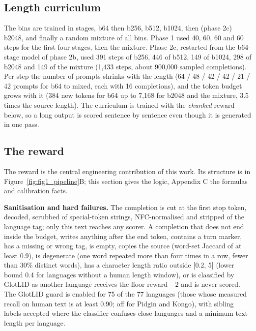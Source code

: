 \subsection{Length curriculum}\label{length-curriculum}

The bins are trained in stages, b64 then b256, b512, b1024, then (phase 2c) b2048, and finally a random mixture of all bins. Phase 1 used 40, 60, 60 and 60 steps for the first four stages, then the mixture. Phase 2c, restarted from the b64-stage model of phase 2b, used 391 steps of b256, 446 of b512, 149 of b1024, 298 of b2048 and 149 of the mixture (1,433 steps, about 900,000 sampled completions). Per step the number of prompts shrinks with the length (64 / 48 / 42 / 42 / 21 / 42 prompts for b64 to mixed, each with 16 completions), and the token budget grows with it (384 new tokens for b64 up to 7,168 for b2048 and the mixture, 3.5 times the source length). The curriculum is trained with the \emph{chunked} reward below, so a long output is scored sentence by sentence even though it is generated in one pass.

\subsection{The reward}\label{the-reward}

The reward is the central engineering contribution of this work. Its structure is in Figure~\ref{fig:fig1_pipeline}B; this section gives the logic, Appendix C the formulas and calibration facts.

\textbf{Sanitisation and hard failures.} The completion is cut at the first stop token, decoded, scrubbed of special-token strings, NFC-normalised and stripped of the language tag; only this text reaches any scorer. A completion that does not end inside the budget, writes anything after the end token, contains a turn marker, has a missing or wrong tag, is empty, copies the source (word-set Jaccard of at least 0.9), is degenerate (one word repeated more than four times in a row, fewer than 30\% distinct words), has a character length ratio outside {[}0.2, 5{]} (lower bound 0.4 for languages without a human length window), or is classified by GlotLID \citep{kargaran2023glotlid} as another language receives the floor reward \(-2\) and is never scored. The GlotLID guard is enabled for 75 of the 77 languages (those whose measured recall on human text is at least 0.90; off for Pidgin and Kongo), with sibling labels accepted where the classifier confuses close languages and a minimum text length per language.

